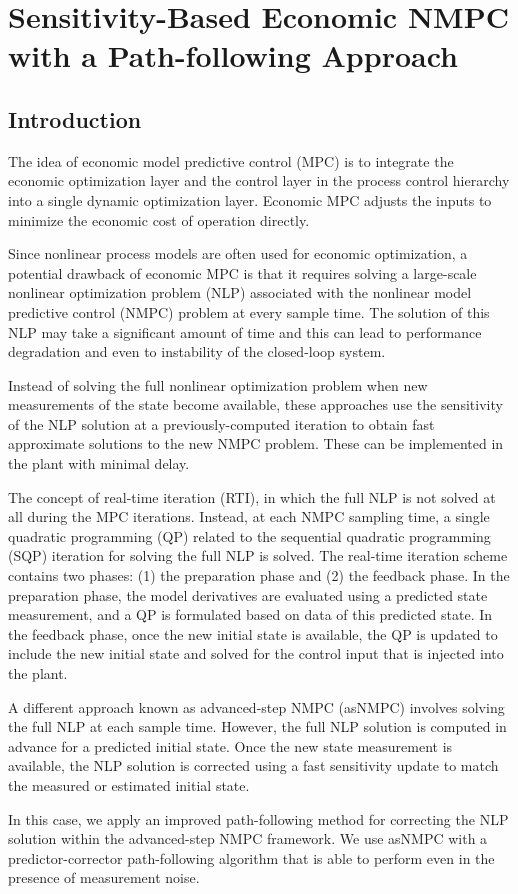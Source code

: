 \documentclass{article}
\theoremstyle{example}
\theoremstyle{definition}
\theoremstyle{assumption}
\theoremstyle{lemma}
\begin{document}
\section{Sensitivity-Based Economic NMPC with a Path-following Approach}
\subsection{Introduction}
	The idea of economic model predictive control (MPC) is to integrate the economic optimization layer and the control layer in the process control hierarchy into a single dynamic optimization layer.
	Economic MPC adjusts the inputs to minimize the economic cost of operation directly.
	\par
	Since nonlinear process models are often used for economic optimization, a potential drawback of economic MPC is that it requires solving a large-scale nonlinear optimization problem (NLP) associated with the nonlinear model predictive control (NMPC) problem at every sample time.
	The solution of this NLP may take a significant amount of time and this can lead to performance degradation and even to instability of the closed-loop system.
	\par
	Instead of solving the full nonlinear optimization problem when new measurements of the state become available, these approaches use the sensitivity of the NLP solution at a previously-computed iteration to obtain fast approximate solutions to the new NMPC problem.
	These can be implemented in the plant with minimal delay.
	\par
	The concept of real-time iteration (RTI), in which the full NLP is not solved at all during the MPC iterations.
	Instead, at each NMPC sampling time, a single quadratic programming (QP) related to the sequential quadratic programming (SQP) iteration for solving the full NLP is solved.
	The real-time iteration scheme contains two phases: (1) the preparation phase and (2) the feedback phase.
	In the preparation phase, the model derivatives are evaluated using a predicted state measurement, and a QP is formulated based on data of this predicted state.
	In the feedback phase, once the new initial state is available, the QP is updated to include the new initial state and solved for the control input that is injected into the plant.
	\par
	A different approach known as advanced-step NMPC (asNMPC) involves solving the full NLP at each sample time.
	However, the full NLP solution is computed in advance for a predicted initial state.
	Once the new state measurement is available, the NLP solution is corrected using a fast sensitivity update to match the measured or estimated initial state.
	\par
	In this case, we apply an improved path-following method for correcting the NLP solution within the advanced-step NMPC framework.
	We use asNMPC with a predictor-corrector path-following algorithm that is able to perform even in the presence of measurement noise.
\end{document}
